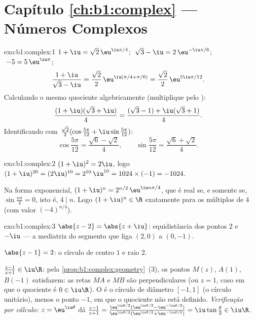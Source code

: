 \section*{Capítulo \ref{ch:b1:complex} --- Números Complexos}

\begin{solution}{exo:b1:complex:1}
$1 + \iu = \sqrt 2\, \eu^{\iu\pi/4}$;
$\;\sqrt 3 - \iu = 2\, \eu^{-\iu\pi/6}$;
$\;-5 = 5\, \eu^{\iu\pi}$;
\[
\frac{1 + \iu}{\sqrt 3 - \iu}
= \frac{\sqrt 2}{2}\, \eu^{\iu(\pi/4 + \pi/6)}
= \frac{\sqrt 2}{2}\, \eu^{5\iu\pi/12}.
\]
Calculando o mesmo quociente algebricamente (multiplique pelo ):
\[
\frac{(1 + \iu)(\sqrt 3 + \iu)}{4}
= \frac{(\sqrt 3 - 1) + \iu(\sqrt 3 + 1)}{4}.
\]
Identificando com $\frac{\sqrt 2}{2}(\cos\frac{5\pi}{12} +
\iu\sin\frac{5\pi}{12})$:
\[
\cos\frac{5\pi}{12} = \frac{\sqrt 6 - \sqrt 2}{4},
\qquad
\sin\frac{5\pi}{12} = \frac{\sqrt 6 + \sqrt 2}{4}.
\]
\end{solution}

\begin{solution}{exo:b1:complex:2}
$(1+\iu)^2 = 2\iu$, logo $(1+\iu)^{20} = (2\iu)^{10} = 2^{10}\,\iu^{10}
= 1024 \times (-1) = -1024$.

Na forma exponencial, $(1+\iu)^n = 2^{n/2}\, \eu^{\iu n\pi/4}$, que é real se,
e somente se, $\sin\frac{n\pi}{4} = 0$, isto é, $4 \mid n$. Logo $(1+\iu)^n
\in \R$
exatamente para os múltiplos de $4$ (com valor $(-4)^{n/4}$).
\end{solution}

\begin{solution}{exo:b1:complex:3}
$\abs{z - 2} = \abs{z + \iu}$: equidistância dos pontos $2$ e
$-\iu$ --- a mediatriz do segmento que liga $(2, 0)$
a $(0, -1)$.

$\abs{z - 1} = 2$: o círculo de centro $1$ e raio $2$.

$\frac{z-1}{z+1} \in \iu\R$: pela
\cref{prop:b1:complex:geometry}~(3), os pontos $M(z)$, $A(1)$,
$B(-1)$ satisfazem: as retas $MA$ e $MB$ são perpendiculares (ou $z = 1$,
caso em que o quociente é $0 \in \iu\R$). O  é o círculo de
diâmetro $[-1, 1]$ (o círculo unitário), menos o ponto $-1$, em que o
quociente não está definido. \emph{Verificação por cálculo:} $z = \eu^{\iu\theta}$ dá
$\frac{z-1}{z+1} = \frac{\eu^{\iu\theta/2}(\eu^{\iu\theta/2} -
\eu^{-\iu\theta/2})}{\eu^{\iu\theta/2}(\eu^{\iu\theta/2} +
\eu^{-\iu\theta/2})} = \iu\tan\frac\theta2 \in \iu\R$.
\end{solution}


